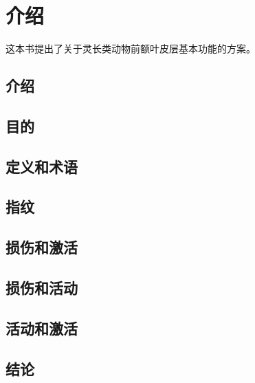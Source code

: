 \chapter{介绍}
这本书提出了关于灵长类动物前额叶皮层基本功能的方案。
\section{介绍}

\section{目的}

\section{定义和术语}


\section{指纹}

\section{损伤和激活}

\section{损伤和活动}

\section{活动和激活}




\section{结论}


